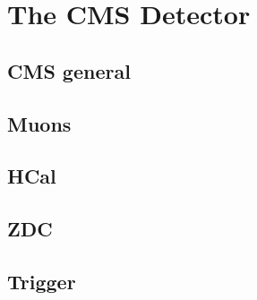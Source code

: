 \chapter{The CMS Detector}	
  \section{CMS general}
  \section{Muons}
  \section{HCal}
  \section{ZDC}
  \section{Trigger}
